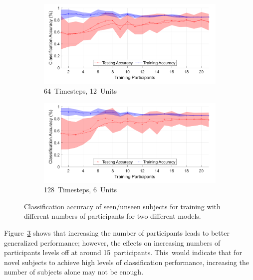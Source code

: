 \begin{figure}[!hbt]
    \centering
    \begin{subfigure}[H]{0.49\textwidth}
         \centering
        \includegraphics[width=\textwidth]{content/4-LSTM_Behaviour/results/number_participants_64x12.pdf}
        \caption{64~Timesteps, 12~Units}
        \label{fig:subject_num_generalisation_64x12}
    \end{subfigure}
    \hfil
    \begin{subfigure}[H]{0.49\textwidth}
         \centering
        \includegraphics[width=\textwidth]{content/4-LSTM_Behaviour/results/number_participants_128x6.pdf}
        \caption{128~Timesteps, 6~Units}
        \label{fig:subject_num_generalisation_128x6}
    \end{subfigure}
    \caption[Classification accuracy for training with different numbers of participants]{Classification accuracy of seen/unseen subjects for training with different numbers of participants for two different models.}
    \label{fig:subject_num_generalisation}
\end{figure}


Figure~\ref{fig:subject_num_generalisation} shows that increasing the number of participants leads to better generalized performance; however, the effects on increasing numbers of participants levels off at around 15~participants. This~would indicate that for novel subjects to achieve high levels of classification performance, increasing the number of subjects alone may not be enough.

